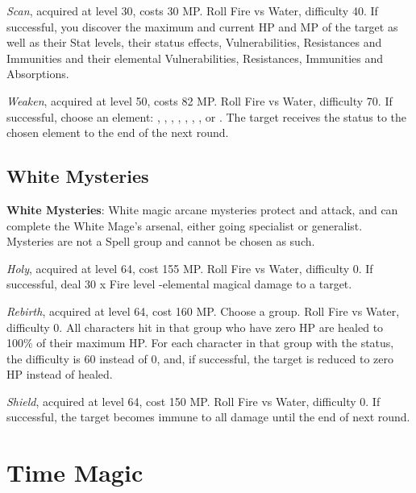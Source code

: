 \begin{multicols}{2}
    \textit{Scan}, acquired at level 30, costs 30 MP\@. Roll Fire vs Water, difficulty 40. If successful, you discover the maximum and current HP and MP of the target as well as their Stat levels, their status effects, Vulnerabilities, Resistances and Immunities and their elemental Vulnerabilities, Resistances, Immunities and Absorptions.

    \textit{Weaken}, acquired at level 50, costs 82 MP\@. Roll Fire vs Water, difficulty 70. If successful, choose an element: , , , , , , ,  or . The target receives the status  to the chosen element to the end of the next round. 

    \subsection{White Mysteries}\label{subsec:white-mysteries}

    \textbf{White Mysteries}: White magic arcane mysteries protect and attack, and can complete the White Mage's arsenal, either going specialist or generalist. Mysteries are not a Spell group and cannot be chosen as such.

    \textit{Holy}, acquired at level 64, cost 155 MP\@. Roll Fire vs Water, difficulty 0. If successful, deal 30 x Fire level -elemental magical damage to a target.  

    \textit{Rebirth}, acquired at level 64, cost 160 MP\@. Choose a group. Roll Fire vs Water, difficulty 0. All characters hit in that group who have zero HP are healed to 100\% of their maximum HP\@. For each character in that group with the  status, the difficulty is 60 instead of 0, and, if successful, the target is reduced to zero HP instead of healed.

    \textit{Shield}, acquired at level 64, cost 150 MP\@. Roll Fire vs Water, difficulty 0. If successful, the target becomes immune to all damage until the end of next round.


\end{multicols}

\section{Time Magic}\label{sec:magic-time}

